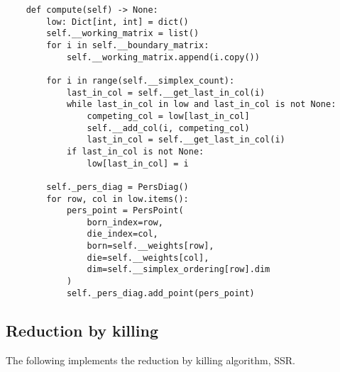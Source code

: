 \begin{verbatim}
    def compute(self) -> None:
        low: Dict[int, int] = dict()
        self.__working_matrix = list()
        for i in self.__boundary_matrix:
            self.__working_matrix.append(i.copy())

        for i in range(self.__simplex_count):
            last_in_col = self.__get_last_in_col(i)
            while last_in_col in low and last_in_col is not None:
                competing_col = low[last_in_col]
                self.__add_col(i, competing_col)
                last_in_col = self.__get_last_in_col(i)
            if last_in_col is not None:
                low[last_in_col] = i

        self._pers_diag = PersDiag()
        for row, col in low.items():
            pers_point = PersPoint(
                born_index=row,
                die_index=col,
                born=self.__weights[row],
                die=self.__weights[col],
                dim=self.__simplex_ordering[row].dim
            )
            self._pers_diag.add_point(pers_point)
\end{verbatim}

\subsection{Reduction by killing}

The following implements the reduction by killing algorithm, \textsc{SSR}.

